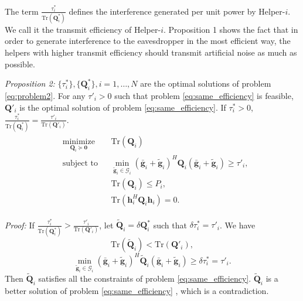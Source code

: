 \documentclass[journal]{IEEEtran}
\begin{document}
The term $\frac{\tau_i^*}{\mathrm{Tr}(\mathbf{Q}_i^*)}$ defines the interference generated per unit power by Helper-$i$. We call it the transmit efficiency of Helper-$i$. Proposition 1 shows the fact that in order to generate interference to the eavesdropper in the most efficient way, the helpers with higher transmit efficiency should transmit artificial noise as much as possible.

\emph{Proposition 2:} $\{\tau_i^*\}, \{\mathbf{Q}_i^*\}, i = 1, \ldots, N$ are the optimal solutions of problem \eqref{eq:problem2}. For any $ \tau'_i > 0$ such that problem \eqref{eq:same_efficiency} is feasible, $ \mathbf{Q}'_i$ is the optimal solution of problem \eqref{eq:same_efficiency}. If $\tau_i^* > 0$, $\frac{\tau_i^*}{\text{Tr}(\mathbf{Q}_i^*)} = \frac{\tau'_i}{\text{Tr}(\mathbf{Q}'_i)}$.
\begin{eqnarray}\label{eq:same_efficiency}
\begin{aligned} 
& \underset{\mathbf{Q}_i \succeq \mathbf{0}}{\text{minimize}}
& & \text{Tr}(\mathbf{Q}_i)\\
& \text{subject to}
& & \min_{\tilde{\mathbf{g}}_i \in \mathcal{G}_i}(\bar{\mathbf{g}}_i+\tilde{\mathbf{g}}_i)^H\mathbf{Q}_i(\bar{\mathbf{g}}_i+\tilde{\mathbf{g}}_i) \geq \tau'_i,\\
&&& \text{Tr}\left(\mathbf{Q}_i\right) \leq P_i,\\ 
&&&\text{Tr}\left(\mathbf{h}_i^H\mathbf{Q}_i\mathbf{h}_i\right) = 0.
\end{aligned}
\end{eqnarray}

\emph{Proof:} If $\frac{\tau_i^*}{\text{Tr}(\mathbf{Q}_i^*)} > \frac{\tau'_i}{\text{Tr}(\mathbf{Q}'_i)}$, let $\tilde{\mathbf{Q}}_i = \delta\mathbf{Q}_i^ *$ such that $\delta\tau_i^* = \tau'_i$. We have
\begin{equation}
\text{Tr}(\tilde{\mathbf{Q}}_i) < \text{Tr}(\mathbf{Q}'_i), \nonumber
\end{equation}
\begin{equation}
\min_{\tilde{\mathbf{g}}_i \in \mathcal{G}_i}(\bar{\mathbf{g}}_i+\tilde{\mathbf{g}}_i)^H\tilde{\mathbf{Q}}_i(\bar{\mathbf{g}}_i+\tilde{\mathbf{g}}_i) \geq \delta\tau_i^* = \tau'_i. \nonumber
\end{equation}
Then $\tilde{\mathbf{Q}}_i$ satisfies all the constraints of problem \eqref{eq:same_efficiency}. $\tilde{\mathbf{Q}}_i$  is a better solution of problem \eqref{eq:same_efficiency} , which is a contradiction.
\end{document}
